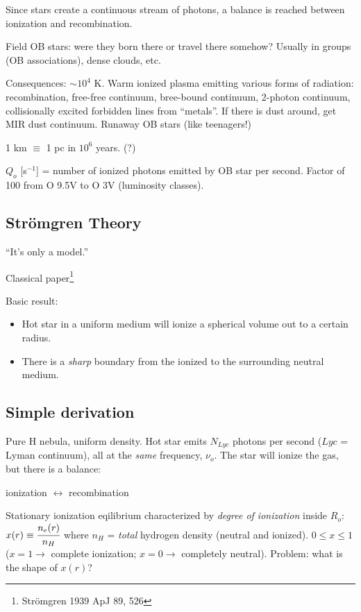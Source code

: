 \documentclass[12pt]{article}
\newcommand{\mar}[1]{\hspace{0pt}\marginpar{-{#1}-}}
\begin{document}
\textcolor{bred}{Since stars create a continuous stream of photons, a
balance is reached between ionization and recombination.}

Field OB stars: were they born there or travel there somehow? Usually in
groups (OB associations), dense clouds, etc.

Consequences: $\sim 10^{4}$ K. Warm ionized plasma emitting various forms
of radiation: recombination, free-free continuum, bree-bound continuum,
2-photon continuum, collisionally excited forbidden lines from ``metals''.
If there is dust around, get MIR dust continuum. Runaway OB stars (like
teenagers!)

1 km $\equiv$ 1 pc in $10^{6}$ years. (?)

$Q_{o}$ [s$^{-1}$]
= number of ionized photons emitted by OB star per second.
Factor of 100 from O 9.5V to O 3V (luminosity classes).

\mar{52}
\subsection{Str\"{o}mgren Theory}
``It's only a model.''

Classical paper\footnote{Str\"{o}mgren 1939 ApJ 89, 526}

Basic result:
\begin{itemize}
    \item Hot star in a uniform medium will ionize a spherical volume out to a certain radius.
    \item There is a \emph{sharp} boundary from the ionized to the
        surrounding neutral medium.
\end{itemize}
\subsection{Simple derivation}
Pure H nebula, uniform density. Hot star emits $N_{Lyc}$ photons per
second ($Lyc$ = Lyman continuum), all at the \emph{same} frequency, $\nu_{o}$.
The star will ionize the gas, but there is a balance:
\begin{center}
    ionization $\leftrightarrow$ recombination
\end{center}
Stationary ionization eqilibrium characterized by \textit{degree of ionization}
inside $R_{o}$: $x(r) \equiv \cfrac{n_{e}(r)}{n_{H}}$ where $n_{H}$ = \emph{total}
hydrogen density (neutral and ionized).
$0 \le x \le 1$ ($x = 1 \rightarrow$ complete ionization; $x = 0
\rightarrow$ completely neutral). Problem: what is the shape of $x(r)$?
\end{document}
